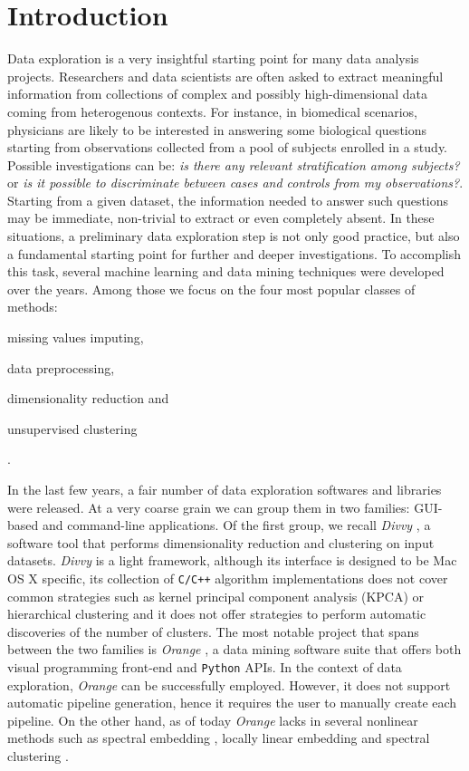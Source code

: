 \documentclass[twoside,11pt]{article}
\makeatletter
\newcommand{\py}{\texttt{Python}\@\xspace}
\makeatother
\begin{document}
\section{Introduction}\label{sec:intro}
Data exploration is a very insightful starting point for many data analysis projects. Researchers and data scientists are often asked to extract meaningful information from collections of complex and possibly high-dimensional data coming from heterogenous contexts. For instance, in biomedical scenarios, physicians are likely to be interested in answering some biological questions starting from observations collected from a pool of subjects enrolled in a study. Possible investigations can be: \emph{is there any relevant stratification among subjects?} or \emph{is it possible to discriminate between cases and controls from my observations?}. Starting from a given dataset, the information needed to answer such questions may be immediate, non-trivial to extract or even completely absent.
In these situations, a preliminary data exploration step is not only good practice, but also a fundamental starting point for further and deeper investigations. To accomplish this task, several machine learning and data mining techniques were developed over the years. Among those we focus on the four most popular classes of methods: \begin{enumerate*}[label=(\roman*)]
  \item missing values imputing,
  \item data preprocessing,
  \item dimensionality reduction and
  \item unsupervised clustering
\end{enumerate*}.

In the last few years, a fair number of data exploration softwares and libraries  were released. At a very coarse grain we can group them in two families: GUI-based and command-line  applications. Of the first group, we recall \emph{Divvy} \citep{lewis2013divvy}, a software tool that performs dimensionality reduction and clustering on input datasets. \emph{Divvy} is a light framework, although its interface is designed to be Mac OS X specific, 
its collection of \texttt{C/C++} algorithm implementations does not cover common strategies such as kernel principal component analysis (KPCA) \citep{scholkopf1997kernel} or hierarchical clustering \citep{friedman2001elements} and it does not offer strategies to perform automatic discoveries of the number of clusters. The most notable project that spans between the two families is \emph{Orange} \citep{demvsar2013orange}, a data mining software suite that offers both visual programming front-end and \py APIs. In the context of data exploration, \emph{Orange} can be successfully employed. However, it does not support automatic pipeline generation, hence it requires the user to manually create each pipeline. On the other hand, as of today \emph{Orange} lacks in several nonlinear methods such as spectral embedding \citep{ng2002spectral}, locally linear embedding \citep{roweis2000nonlinear} and spectral clustering \citep{shi2000normalized}.
\end{document}
